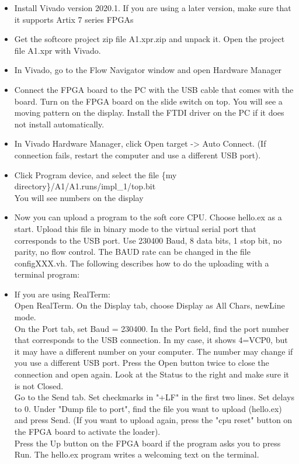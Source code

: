 \documentclass[11pt,a4paper,oneside,openright]{report}
\begin{document}
\begin{itemize}
\item Install Vivado version 2020.1. If you are using a later version, make sure that it supports Artix 7 series FPGAs
\item Get the softcore project zip file A1.xpr.zip and unpack it. Open the project file A1.xpr with Vivado.
\item In Vivado, go to the Flow Navigator window and open Hardware Manager
\item Connect the FPGA board to the PC with the USB cable that comes with the board. Turn on the FPGA board on the slide switch on top. You will see a moving pattern on the display. Install the FTDI driver on the PC if it does not install automatically.
\item In Vivado Hardware Manager, click Open target -> Auto Connect. (If connection fails, restart the computer and use a different USB port).
\item Click Program device, and select the file \{my directory\}/A1/A1.runs/impl\_1/top.bit \\
You will see numbers on the display
\item Now you can upload a program to the soft core CPU. Choose hello.ex as a start. Upload this file in binary mode to the virtual serial port that corresponds to the USB port. Use 230400 Baud, 8 data bits, 1 stop bit, no parity, no flow control. 
The BAUD rate can be changed in the file configXXX.vh. 
The following describes how to do the uploading with a terminal program:
\item If you are using RealTerm: \\ 
Open RealTerm. On the Display tab, choose Display as All Chars, newLine mode. \\ 
On the Port tab, set Baud = 230400. In the Port field, find the port number that corresponds to the USB connection. In my case, it shows 4=VCP0, but it may have a different number on your computer. The number may change if you use a different USB port. Press the Open button twice to close the connection and open again. Look at the Status to the right and make sure it is not Closed.\\
Go to the Send tab. Set checkmarks in "+LF" in the first two lines. Set delays to 0. Under "Dump file to port", find the file you want to upload (hello.ex) and press Send. (If you want to upload again, press the "cpu reset" button on the FPGA board to activate the loader).\\
Press the Up button on the FPGA board if the program asks you to press Run. The hello.ex program writes a welcoming text on the terminal.

\end{itemize}
\end{document}
